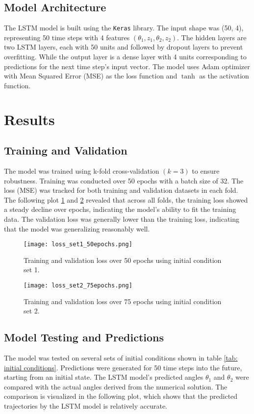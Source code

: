 \documentclass[12pt]{article}
\begin{document}
\subsection{Model Architecture}
The LSTM model is built using the \texttt{Keras} library. The input shape was (50, 4), representing 50 time steps with 4 features $(\theta_1, z_1, \theta_2, z_2)$.
The hidden layers are two LSTM layers, each with 50 units and followed by dropout layers to prevent overfitting.
While the output layer is a dense layer with 4 units corresponding to predictions for the next time step's input vector. The model uses Adam optimizer with Mean Squared Error (MSE) as the loss function and $\tanh$ as the activation function.

\section{Results}

\subsection{Training and Validation}
The model was trained using k-fold cross-validation $(k=3)$ to ensure robustness. Training was conducted over 50 epochs with a batch size of 32. The loss (MSE) was tracked for both training and validation datasets in each fold. The following plot \ref*{fig:loss_set1_50epochs} and \ref*{fig:loss_set2_75epochs} revealed that across all folds, the training loss showed a steady decline over epochs, indicating the model's ability to fit the training data. 
The validation loss was generally lower than the training loss, indicating that the model was generalizing reasonably well.

\begin{figure}[H]
    \centering
    \texttt{[image: loss\_set1\_50epochs.png]}
    \caption{Training and validation loss over 50 epochs using initial condition set 1.}
    \label{fig:loss_set1_50epochs}
\end{figure}

\begin{figure}[H]
    \centering
    \texttt{[image: loss\_set2\_75epochs.png]}
    \caption{Training and validation loss over 75 epochs using initial condition set 2.}
    \label{fig:loss_set2_75epochs}
\end{figure}

\subsection{Model Testing and Predictions}
The model was tested on several sets of initial conditions shown in table \ref{tab: initial conditions}. Predictions were generated for 50 time steps into the future, starting from an initial state. The LSTM model's predicted angles $\theta_1$ and $\theta_2$ were compared with the actual angles derived from the numerical solution. 
The comparison is visualized in the following plot, which shows that the predicted trajectories by the LSTM model is relatively accurate.
\end{document}
